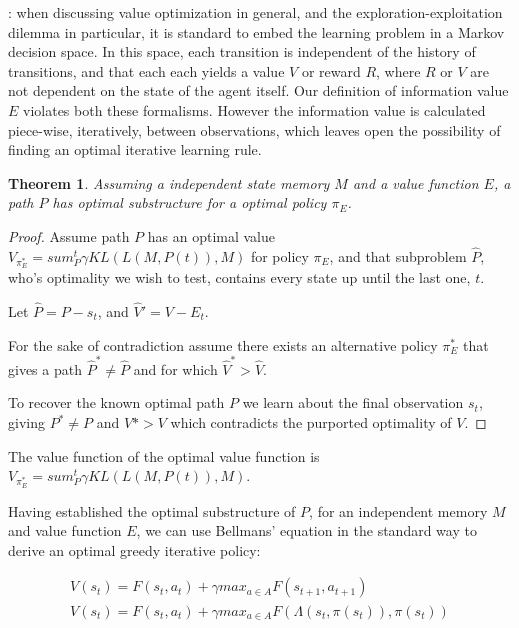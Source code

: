 \documentclass[9pt,twocolumn,twoside]{pnas-new}
\newtheorem{theorem}{Theorem}
\begin{document}
{{: when discussing value optimization in general, and the exploration-exploitation dilemma in particular, it is standard to embed the learning problem in a Markov decision space. In this space, each transition is independent of the history of transitions, and that each each yields a value $V$ or reward $R$, where $R$ or $V$ are not dependent on the state of the agent itself. Our definition of information value $E$ violates both these formalisms. However the information value is calculated piece-wise, iteratively, between observations, which leaves open the possibility of finding an optimal iterative learning rule. 

\begin{theorem}
    Assuming a independent state memory $M$ and a value function $E$, a path $P$ has optimal substructure for a optimal policy $\pi_E$.
\end{theorem}
\begin{proof}
    Assume path $P$ has an optimal value $V_{\pi_E^*} = sum^t_P \gamma KL(L(M, P(t)), M)$ for policy $\pi_E$, and that subproblem $\hat P$, who's optimality we wish to test, contains every state up until the last one, $t$. 
    
    Let $\hat P = P - s_t$, and $\hat V' = V - E_t$.

    For the sake of contradiction assume there exists an alternative policy $\pi_E^*$ that gives a path $\hat P^* \neq \hat P$ and for which $\hat V^* > \hat V$. 

    To recover the known optimal path $P$ we learn about the final observation $s_t$, giving $P^* \neq P$ and $V* > V$ which contradicts the purported optimality of $V$.
\end{proof}

The value function of the optimal value function is $V_{\pi_E^*} = sum^t_P \gamma KL(L(M, P(t)), M)$. 

Having established the optimal substructure of $P$, for an independent memory $M$ and value function $E$, we can use Bellmans' equation in the standard way to derive an optimal greedy iterative policy:

\begin{align}
    V(s_t) = F(s_t, a_t) + \gamma max_{a \in A} F(s_{t+1}, a_{t+1}) \\
    V(s_t) = F(s_t, a_t) + \gamma max_{a \in A} F(\Lambda(s_t, \pi(s_t)), \pi(s_t))
\end{align}


}}
\end{document}
